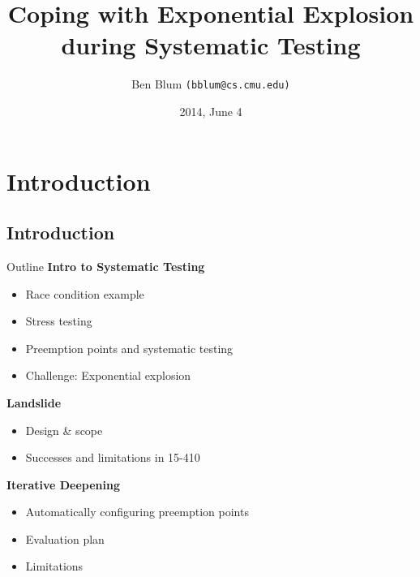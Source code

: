 \documentclass[xcolor=dvipsnames]{beamer}
\title[Landslide]{{\bf Coping with Exponential Explosion \\ during Systematic Testing}}
\author[Ben Blum]{Ben Blum \texttt{(bblum@cs.cmu.edu)}}
\institute[CMU]{Carnegie Mellon University}
\date[]{2014, June 4}
\begin{document}
\normalem
\begin{frame}
	\titlepage
\end{frame}


\newcommand\linegap{\vspace{0.2in}}
\newcommand\breakslide[1]{\begin{frame}{} \begin{center} {\Large #1} \end{center} \end{frame}}

\section{Introduction}


\subsection{Introduction}

\begin{frame}{Outline}
	\textbf{Intro to Systematic Testing}
	\begin{itemize}
		\item Race condition example
		\item Stress testing
		\item Preemption points and systematic testing
		\item Challenge: Exponential explosion
	\end{itemize}
	{\bf Landslide}
	\begin{itemize}
		\item Design \& scope
		\item Successes and limitations in 15-410
	\end{itemize}
	{\bf Iterative Deepening}
	\begin{itemize}
		\item Automatically configuring preemption points
		\item Evaluation plan
		\item Limitations

	\end{itemize}
\end{frame}
\end{document}
